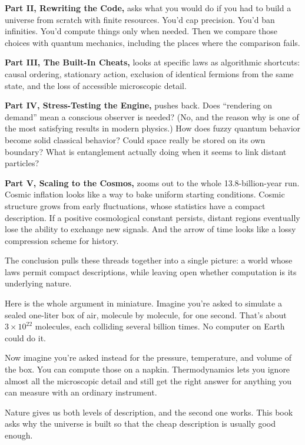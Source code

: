 \textbf{Part II, Rewriting the Code,} asks what you would do if you had to build a universe from scratch with finite resources. You'd cap precision. You'd ban infinities. You'd compute things only when needed. Then we compare those choices with quantum mechanics, including the places where the comparison fails.

\textbf{Part III, The Built-In Cheats,} looks at specific laws as algorithmic shortcuts: causal ordering, stationary action, exclusion of identical fermions from the same state, and the loss of accessible microscopic detail.

\textbf{Part IV, Stress-Testing the Engine,} pushes back. Does ``rendering on demand'' mean a conscious observer is needed? (No, and the reason why is one of the most satisfying results in modern physics.) How does fuzzy quantum behavior become solid classical behavior? Could space really be stored on its own boundary? What is entanglement actually doing when it seems to link distant particles?

\textbf{Part V, Scaling to the Cosmos,} zooms out to the whole 13.8-billion-year run. Cosmic inflation looks like a way to bake uniform starting conditions. Cosmic structure grows from early fluctuations, whose statistics have a compact description. If a positive cosmological constant persists, distant regions eventually lose the ability to exchange new signals. And the arrow of time looks like a lossy compression scheme for history.

The conclusion pulls these threads together into a single picture: a world whose laws permit compact descriptions, while leaving open whether computation is its underlying nature.

\begin{examplebox}
Here is the whole argument in miniature. Imagine you're asked to simulate a sealed one-liter box of air, molecule by molecule, for one second. That's about \(3 \times 10^{22}\) molecules, each colliding several billion times. No computer on Earth could do it.

Now imagine you're asked instead for the pressure, temperature, and volume of the box. You can compute those on a napkin. Thermodynamics lets you ignore almost all the microscopic detail and still get the right answer for anything you can measure with an ordinary instrument.

Nature gives us both levels of description, and the second one works. This book asks why the universe is built so that the cheap description is usually good enough.
\end{examplebox}

